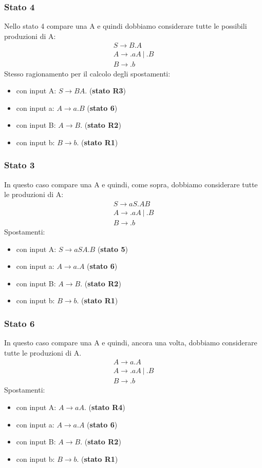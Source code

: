 \documentclass[a4paper, fleqn]{report}
\begin{document}
\subsubsection{Stato 4}
Nello stato 4 compare una A e quindi dobbiamo considerare tutte le possibili produzioni di A:
\begin{gather*}
S \rightarrow B.A \\
A \rightarrow .aA\ |\ .B \\
B \rightarrow .b
\end{gather*}
Stesso ragionamento per il calcolo degli spostamenti:
\begin{itemize}
\item con input A: \(S \rightarrow BA.\) (\textbf{stato R3})
\item con input a: \(A \rightarrow a.B\) (\textbf{stato 6})
\item con input B: \(A \rightarrow B.\) (\textbf{stato R2})
\item con input b: \(B \rightarrow b.\) (\textbf{stato R1})
\end{itemize}

\subsubsection{Stato 3}
In questo caso compare una A e quindi, come sopra, dobbiamo considerare tutte le produzioni di A:
\begin{gather*}
S \rightarrow aS.AB \\
A \rightarrow .aA\ |\ .B \\
B \rightarrow .b
\end{gather*}
Spostamenti:
\begin{itemize}
\item con input A: \(S \rightarrow aSA.B\) (\textbf{stato 5})
\item con input a: \(A \rightarrow a.A\) (\textbf{stato 6})
\item con input B: \(A \rightarrow B.\) (\textbf{stato R2})
\item con input b: \(B \rightarrow b.\) (\textbf{stato R1})
\end{itemize}

\subsubsection{Stato 6}
In questo caso compare una A e quindi, ancora una volta, dobbiamo considerare tutte le produzioni di A.
\begin{gather*}
A \rightarrow a.A \\
A \rightarrow .aA\ |\ .B \\
B \rightarrow .b
\end{gather*}
Spostamenti:
\begin{itemize}
\item con input A: \(A \rightarrow aA.\) (\textbf{stato R4})
\item con input a: \(A \rightarrow a.A\) (\textbf{stato 6})
\item con input B: \(A \rightarrow B.\) (\textbf{stato R2})
\item con input b: \(B \rightarrow b.\) (\textbf{stato R1})
\end{itemize}
\end{document}

